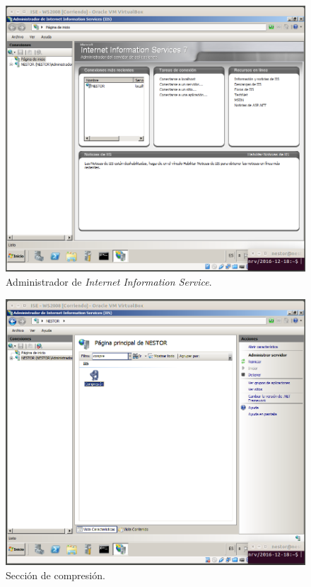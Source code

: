 \documentclass[a4paper,titlepage,12pt]{scrartcl}	%
\numberwithin{figure}{section} %
\numberwithin{table}{section} %
\begin{document}
	\begin{figure}[H]
		\centering
		\includegraphics[scale=0.33]{./Imagenes/5-1.png}
		\caption[Administrador de \textit{Internet Information Service}.]{Administrador de \textit{Internet Information Service}.}
		\label{5-1}
	\end{figure}
		
	\begin{figure}[H]
		\centering
		\includegraphics[scale=0.33]{./Imagenes/5-2.png}
		\caption[Sección de compresión.]{Sección de compresión.}
		\label{5-2}
	\end{figure}
	
\end{document}
